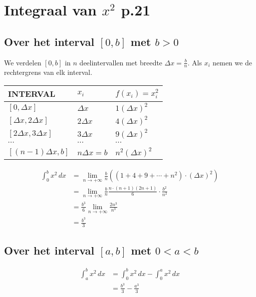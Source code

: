 \documentclass{article}
\theoremstyle{definition}
\begin{document}
\section{Integraal van $x^2$ p.21}
\subsection{Over het interval $\left[0,b\right]$ met $b>0$}
We verdelen $\left[0,b\right]$ in $n$ deelintervallen met breedte $\Delta x = \frac{b}{n}.$ Als $x_i$ nemen we de rechtergrens van elk interval.
\begin{center}
  \begin{tabularx}{\textwidth}{| >{\centering\arraybackslash}X | >{\centering\arraybackslash}X | >{\centering\arraybackslash}X|}
    \hline
    INTERVAL & $x_i$ & $f\left(x_i\right) = x_i^2$\\
    \hline
    \hline
    $\left[0, \Delta x\right]$ & $\Delta x$ & $1\left(\Delta x\right)^2$\\
   \hline
    $\left[\Delta x, 2\Delta x\right]$ & $2\Delta x$ & $4\left(\Delta x\right)^2$\\
    \hline
    $\left[2\Delta x, 3\Delta x\right]$ & $3\Delta x$ & $9\left(\Delta x\right)^2$\\
    \hline
    $\cdots$ &$\cdots$ &$\cdots$\\
    \hline
    $\left[\left(n-1\right)\Delta x, b\right]$ & $n\Delta x = b$ & $n^2\left(\Delta x\right)^2$\\
    \hline
  \end{tabularx}
\end{center}

\begin{align*}
  \displaystyle\int_{0}^{b}x^2\, dx &= \lim_{n\to + \infty}\frac{b}{n}\left(\left(1+4+9+\cdots+n^2\right)\cdot\left(\Delta x\right)^2\right)\\
                                    &=\lim_{n\to + \infty}\frac{b}{n}\frac{n\cdot\left(n+1\right)\left(2n+1\right)}{6}\cdot \frac{b^2}{n^2}\\
                                    &=\frac{b^3}{6}\lim_{n\to + \infty}\frac{2n^3}{n^3}\\
                                    &= \frac{b^3}{3}
\end{align*}
\subsection{Over het interval $\left[a,b\right]$ met $0<a<b$}
\begin{align*}
  \displaystyle\int_{a}^{b}x^2\,dx &= \displaystyle\int_{0}^{b}x^2\, dx - \displaystyle\int_{0}^{a}x^2 \, dx\\
                                   &= \frac{b^3}{3} - \frac{a^3}{3}
\end{align*}
\end{document}
